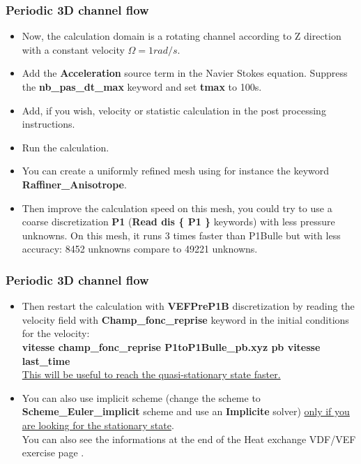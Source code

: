 \documentclass[10pt, hyperref={unicode=true,pdfusetitle, bookmarks=true,bookmarksnumbered=false,bookmarksopen=false, breaklinks=false,pdfborder={0 0 1},backref=true,colorlinks=true,linkcolor=darkblue,pageanchor}]{beamer}
\begin{document}
\begin{frame}
\frametitle{Periodic 3D channel flow}
\begin{block}{}

\begin{itemize}
\item Now, the calculation domain is a rotating channel according to Z direction with a constant velocity $\Omega=1 rad/s$. 

\item Add the \textbf{Acceleration} source term in the Navier Stokes equation. Suppress the \textbf{nb\_pas\_dt\_max} keyword and set \textbf{tmax} to 100s.

\item Add, if you wish, velocity or statistic calculation in the post processing instructions. 

\item Run the calculation.

\item You can create a uniformly refined mesh using for instance the keyword \textbf{Raffiner\_Anisotrope}.

\item Then improve the calculation speed on this mesh, you could try to use a coarse discretization \textbf{P1} (\textbf{Read dis \{ P1 \}} keywords) with less pressure unknowns. On this mesh, it runs 3 times faster than P1Bulle but with less accuracy: 8452 unknowns compare to 49221 unknowns.
\end{itemize}

\end{block}
\end{frame}
\begin{frame}
\frametitle{Periodic 3D channel flow}
\begin{block}{}

\begin{itemize}
\item Then restart the calculation with \textbf{VEFPreP1B} discretization by reading the velocity field with \textbf{Champ\_fonc\_reprise} keyword in the initial conditions for the velocity:\\
\textbf{vitesse champ\_fonc\_reprise P1toP1Bulle\_pb.xyz  pb  vitesse  last\_time} \\
\underline{This will be useful to reach the quasi-stationary state faster.}

\item You can also use implicit scheme (change the scheme to \textbf{Scheme\_Euler\_implicit} scheme and use an \textbf{Implicite} solver) \underline{only if you are looking for the stationary state}.\\ 
You can also see the informations at the end of the Heat exchange VDF/VEF exercise page \pageref{schema_impl}.
\end{itemize}

\end{block}
\end{frame}
\end{document}
